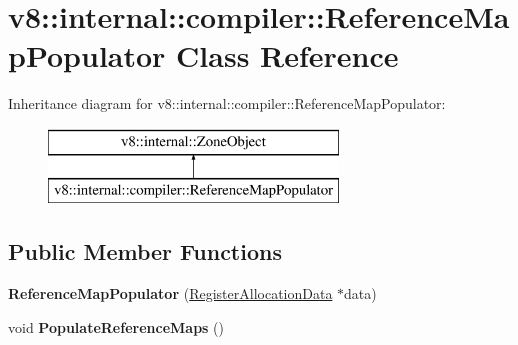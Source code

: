 \hypertarget{classv8_1_1internal_1_1compiler_1_1_reference_map_populator}{}\section{v8\+:\+:internal\+:\+:compiler\+:\+:Reference\+Map\+Populator Class Reference}
\label{classv8_1_1internal_1_1compiler_1_1_reference_map_populator}
Inheritance diagram for v8\+:\+:internal\+:\+:compiler\+:\+:Reference\+Map\+Populator\+:\begin{figure}[H]
\begin{center}
\leavevmode
\includegraphics[height=2.000000cm]{classv8_1_1internal_1_1compiler_1_1_reference_map_populator}
\end{center}
\end{figure}
\subsection*{Public Member Functions}
\begin{DoxyCompactItemize}
\item 
{\bfseries Reference\+Map\+Populator} (\hyperlink{classv8_1_1internal_1_1compiler_1_1_register_allocation_data}{Register\+Allocation\+Data} $\ast$data)\hypertarget{classv8_1_1internal_1_1compiler_1_1_reference_map_populator_aa2bab56c73daa6fb0ef0d1aa17356177}{}\label{classv8_1_1internal_1_1compiler_1_1_reference_map_populator_aa2bab56c73daa6fb0ef0d1aa17356177}

\item 
void {\bfseries Populate\+Reference\+Maps} ()\hypertarget{classv8_1_1internal_1_1compiler_1_1_reference_map_populator_aa5b8cd9b9b7b7ce4b30f775a6f1c3cf6}{}\label{classv8_1_1internal_1_1compiler_1_1_reference_map_populator_aa5b8cd9b9b7b7ce4b30f775a6f1c3cf6}

\end{DoxyCompactItemize}
